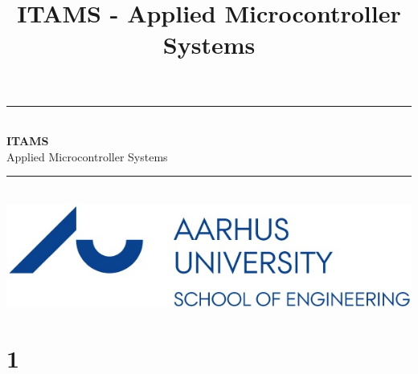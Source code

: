 \documentclass[12pt,a4paper,danish]{book}
\title{ITAMS - Applied Microcontroller Systems}
\newcommand{\HRule}{\rule{\linewidth}{0.5mm}}
\begin{document}
\begin{titlepage}
	\clearpage\thispagestyle{empty}

	\begin{center}
		\HRule \\[0.4cm]
		{\huge \bfseries ITAMS}\\[.3cm] {\huge Applied Microcontroller Systems}\\[0cm]
		\HRule \\[3.4cm]
		\includegraphics[width=0.5\linewidth]{graphics/au}
	\end{center}
	\renewcommand{\contentsname}{Indholdsfortegnelse}
	\tableofcontents

\end{titlepage}
 

\chapter{1}

\end{document}
